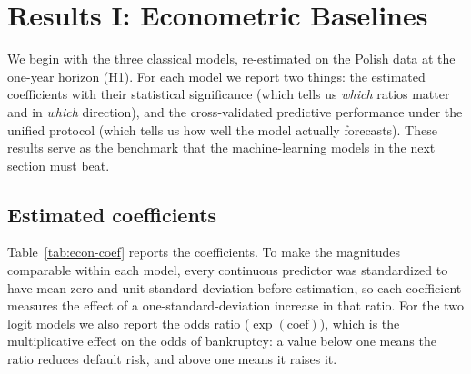 \documentclass[12pt,a4paper]{article}
\begin{document}
\clearpage
\section{Results I: Econometric Baselines}\label{sec:results-econ}

We begin with the three classical models, re-estimated on the Polish data at
the one-year horizon (H1). For each model we report two things: the estimated
coefficients with their statistical significance (which tells us \emph{which}
ratios matter and in \emph{which} direction), and the cross-validated
predictive performance under the unified protocol (which tells us how well the
model actually forecasts). These results serve as the benchmark that the
machine-learning models in the next section must beat.

\subsection{Estimated coefficients}

Table~\ref{tab:econ-coef} reports the coefficients. To make the magnitudes
comparable within each model, every continuous predictor was standardized to
have mean zero and unit standard deviation before estimation, so each
coefficient measures the effect of a one-standard-deviation increase in that
ratio. For the two logit models we also report the odds ratio
($\exp(\text{coef})$), which is the multiplicative effect on the odds of
bankruptcy: a value below one means the ratio reduces default risk, and above
one means it raises it.
\end{document}
